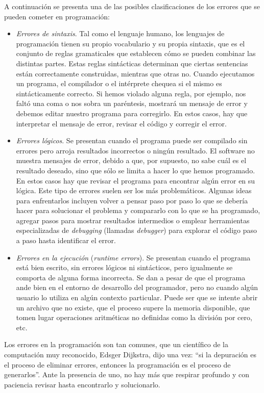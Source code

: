 \documentclass[
]{book}
\begin{document}
A continuación se presenta una de las posibles clasificaciones de los errores que se pueden cometer en programación:

\begin{itemize}
\item
  \emph{Errores de sintaxis}. Tal como el lenguaje humano, los lenguajes de programación tienen su propio vocabulario y su propia sintaxis, que es el conjunto de reglas gramaticales que establecen cómo se pueden combinar las distintas partes. Estas reglas sintácticas determinan que ciertas sentencias están correctamente construidas, mientras que otras no. Cuando ejecutamos un programa, el compilador o el intérprete chequea si el mismo es sintácticamente correcto. Si hemos violado alguna regla, por ejemplo, nos faltó una coma o nos sobra un paréntesis, mostrará un mensaje de error y debemos editar nuestro programa para corregirlo. En estos casos, hay que interpretar el mensaje de error, revisar el código y corregir el error.
\item
  \emph{Errores lógicos}. Se presentan cuando el programa puede ser compilado sin errores pero arroja resultados incorrectos o ningún resultado. El software no muestra mensajes de error, debido a que, por supuesto, no sabe cuál es el resultado deseado, sino que sólo se limita a hacer lo que hemos programado. En estos casos hay que revisar el programa para encontrar algún error en su lógica. Este tipo de errores suelen ser los más problemáticos. Algunas ideas para enfrentarlos incluyen volver a pensar paso por paso lo que se debería hacer para solucionar el problema y compararlo con lo que se ha programado, agregar pasos para mostrar resultados intermedios o emplear herramientas especializadas de \emph{debugging} (llamadas \emph{debugger}) para explorar el código paso a paso hasta identificar el error.
\item
  \emph{Errores en la ejecución} (\emph{runtime errors}). Se presentan cuando el programa está bien escrito, sin errores lógicos ni sintácticos, pero igualmente se comporta de alguna forma incorrecta. Se dan a pesar de que el programa ande bien en el entorno de desarrollo del programador, pero no cuando algún usuario lo utiliza en algún contexto particular. Puede ser que se intente abrir un archivo que no existe, que el proceso supere la memoria disponible, que tomen lugar operaciones aritméticas no definidas como la división por cero, etc.
\end{itemize}

Los errores en la programación son tan comunes, que un científico de la computación muy reconocido, Edsger Dijkstra, dijo una vez: ``si la depuración es el proceso de eliminar errores, entonces la programación es el proceso de generarlos''. Ante la presencia de uno, no hay más que respirar profundo y con paciencia revisar hasta encontrarlo y solucionarlo.
\end{document}
